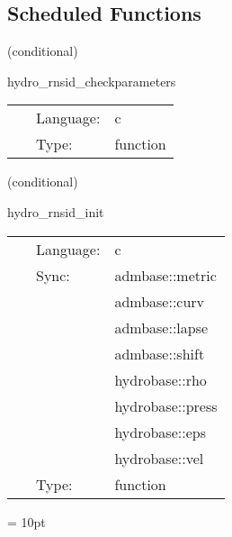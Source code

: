 \subsection*{Scheduled Functions}
\vspace{5mm}

   (conditional) 

\hspace{5mm} hydro\_rnsid\_checkparameters 

\hspace{5mm}{\it check parameters } 


\hspace{5mm}

 \begin{tabular*}{160mm}{cll} 
~ & Language:  & c \\ 
~ & Type:  & function \\ 
\end{tabular*} 


\vspace{5mm}

   (conditional) 

\hspace{5mm} hydro\_rnsid\_init 

\hspace{5mm}{\it create rotating neutron star initial data } 


\hspace{5mm}

 \begin{tabular*}{160mm}{cll} 
~ & Language:  & c \\ 
~ & Sync:  & admbase::metric \\ 
~& ~ &admbase::curv\\ 
~& ~ &admbase::lapse\\ 
~& ~ &admbase::shift\\ 
~& ~ &hydrobase::rho\\ 
~& ~ &hydrobase::press\\ 
~& ~ &hydrobase::eps\\ 
~& ~ &hydrobase::vel\\ 
~ & Type:  & function \\ 
\end{tabular*} 



\vspace{5mm}\parskip = 10pt 


